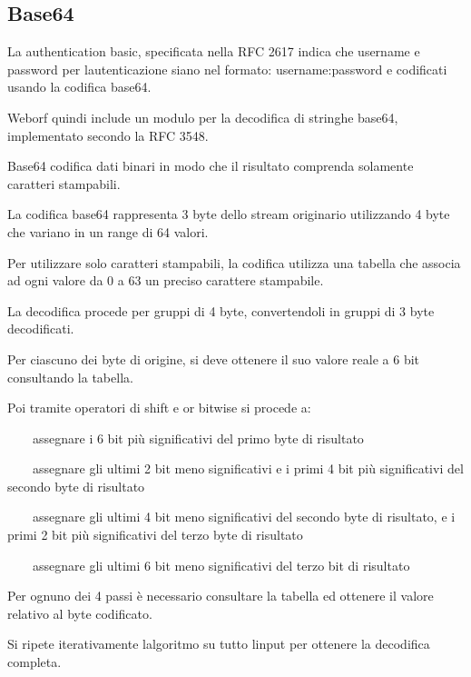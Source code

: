 \documentclass[a4paper,11pt]{article}
\begin{document}
\bigskip

\subsection{Base64}
{\sffamily
La authentication basic, specificata nella RFC 2617 indica che username
e password per l{\textquotesingle}autenticazione siano nel formato:
{\textquotedbl}username:password{\textquotedbl} e codificati usando la
codifica base64. }

{\sffamily
Weborf quindi include un modulo per la decodifica di stringhe base64,
implementato secondo la RFC 3548.}


\bigskip

{\sffamily
Base64 codifica dati binari in modo che il risultato comprenda solamente
caratteri stampabili.}

{\sffamily
La codifica base64 rappresenta 3 byte dello stream originario
utilizzando 4 byte che variano in un range di 64 valori.}

{\sffamily
Per utilizzare solo caratteri stampabili, la codifica utilizza una
tabella che associa ad ogni valore da 0 a 63 un preciso carattere
stampabile.}


\bigskip

{\sffamily
La decodifica procede per gruppi di 4 byte, convertendoli in gruppi di 3
byte decodificati.}

{\sffamily
Per ciascuno dei byte di origine, si deve ottenere il suo valore reale a
6 bit consultando la tabella.}

{\sffamily
Poi tramite operatori di shift e or bitwise si procede a:}

{\sffamily
\ \ \ \ assegnare i 6 bit pi\`u significativi del primo byte di
risultato}

{\sffamily
\ \ \ \ assegnare gli ultimi 2 bit meno significativi e i primi 4 bit
pi\`u significativi del secondo byte di risultato}

{\sffamily
\ \ \ \ assegnare gli ultimi 4 bit meno significativi del secondo byte
di risultato, e i primi 2 bit pi\`u significativi del terzo byte di
risultato}

{\sffamily
\ \ \ \ assegnare gli ultimi 6 bit meno significativi del terzo bit di
risultato}

{\sffamily
Per ognuno dei 4 passi \`e necessario consultare la tabella ed ottenere
il valore relativo al byte codificato.}


\bigskip

{\sffamily
Si ripete iterativamente l{\textquotesingle}algoritmo su tutto
l{\textquotesingle}input per ottenere la decodifica completa.}
\end{document}
